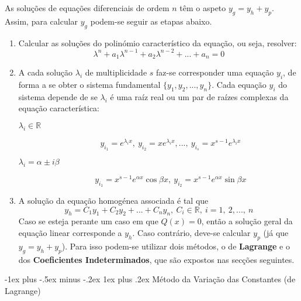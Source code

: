 \documentclass[10pt,landscape]{article}
\makeatletter
\newcommand{\RNum}[1]{\uppercase\expandafter{\romannumeral #1\relax}}
\renewcommand{\subsubsection}{\@startsection{subsubsection}{3}{0mm}%
                                {-1ex plus -.5ex minus -.2ex}%
                                {1ex plus .2ex}%
                                {\normalfont\small\bfseries}}
\makeatother
\begin{document}
\begin{multicols}{3}
As soluções de equações diferenciais de ordem $n$ têm o aspeto $y_g = y_h + y_p$. Assim, para calcular $y_g$ podem-se seguir as etapas abaixo.
\begin{enumerate}
\item Calcular as soluções do polinómio característico da equação, ou seja, resolver:
$$\lambda^n + a_1 \lambda^{n-1} + a_2 \lambda^{n-2} + ... + a_n = 0$$
\item A cada solução $\lambda_i$ de multiplicidade $s$ faz-se corresponder uma equação $y_i$, de forma a se obter o sistema fundamental $\{y_1, y_2, ..., y_n\}$. Cada equação $y_i$ do sistema depende de se $\lambda_i$ é uma raíz real ou um par de raízes complexas da equação característica:
\begin{description}
\item[$\lambda_i \in \mathbb{R}$]
$$y_{i_1} = e^{\lambda_i x},\ y_{i_2} = x e^{\lambda_i x}, ...,\ y_{i_s} = x^{s-1} e^{\lambda_i x}$$
\item[$\lambda_i = \alpha \pm i \beta$]
$$y_{i_1} = x^{s-1} e^{\alpha x} \cos{\beta x},\ y_{i_2} = x^{s-1} e^{\alpha x} \sin{\beta x}$$
\end{description}
\item A solução da equação homogénea associada é tal que
$$y_h = C_1 y_1 + C_2 y_2 + ... + C_n y_n,\ C_i \in \mathbb{R},\ i = 1,\ 2, ...,\ n$$
Caso se esteja perante um caso em que $Q(x) = 0$, então a solução geral da equação linear corresponde a $y_h$. Caso contrário, deve-se calcular $y_p$ (já que $y_g = y_h + y_p$). Para isso podem-se utilizar dois métodos, o de \textbf{Lagrange} e o dos \textbf{Coeficientes Indeterminados}, que são expostos nas secções seguintes.
\end{enumerate}

\subsubsection{\texorpdfstring{\RNum{1}}{TEXT} Método da Variação das Constantes (de Lagrange)}


\end{multicols}
\end{document}
